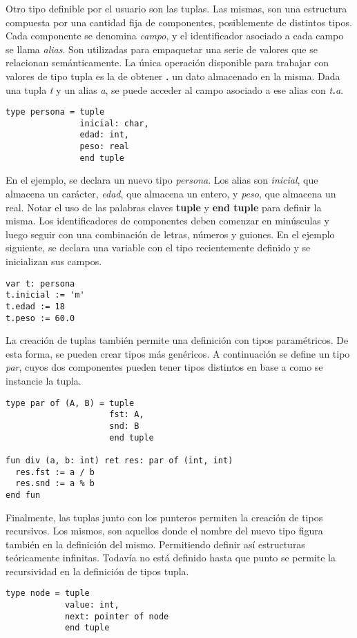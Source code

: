 \documentclass{article}
\begin{document}
Otro tipo definible por el usuario son las tuplas.
Las mismas, son una estructura compuesta por una cantidad fija de componentes, posiblemente de distintos tipos.
Cada componente se denomina \textit{campo}, y el identificador asociado a cada campo se llama \textit{alias}.
Son utilizadas para empaquetar una serie de valores que se relacionan semánticamente.
La única operación disponible para trabajar con valores de tipo tupla es la de obtener \textbf{.} un dato almacenado en la misma.
Dada una tupla \textit{t} y un alias \textit{a}, se puede acceder al campo asociado a ese alias con \textit{t\textbf{.}a}.
\begin{lstlisting}
type persona = tuple
               inicial: char,
               edad: int,
               peso: real
               end tuple
\end{lstlisting}

En el ejemplo, se declara un nuevo tipo \textit{persona}.
Los alias son \textit{inicial}, que almacena un carácter, \textit{edad}, que almacena un entero, y \textit{peso}, que almacena un real.
Notar el uso de las palabras claves \textbf{tuple} y \textbf{end tuple} para definir la misma.
Los identificadores de componentes deben comenzar en minúsculas y luego seguir con una combinación de letras, números y guiones.
En el ejemplo siguiente, se declara una variable con el tipo recientemente definido y se inicializan sus campos.
\begin{lstlisting}
var t: persona
t.inicial := 'm'
t.edad := 18
t.peso := 60.0
\end{lstlisting}

La creación de tuplas también permite una definición con tipos paramétricos.
De esta forma, se pueden crear tipos más genéricos.
A continuación se define un tipo \textit{par}, cuyos dos componentes pueden tener tipos distintos en base a como se instancie la tupla.
\begin{lstlisting}
type par of (A, B) = tuple
                     fst: A,
                     snd: B
                     end tuple
                     
fun div (a, b: int) ret res: par of (int, int)
  res.fst := a / b
  res.snd := a % b
end fun
\end{lstlisting}

Finalmente, las tuplas junto con los punteros permiten la creación de tipos recursivos.
Los mismos, son aquellos donde el nombre del nuevo tipo figura también en la definición del mismo.
Permitiendo definir así estructuras teóricamente infinitas.
Todavía no está definido hasta que punto se permite la recursividad en la definición de tipos tupla.
\begin{lstlisting}
type node = tuple
            value: int,
            next: pointer of node
            end tuple
\end{lstlisting}
\end{document}
